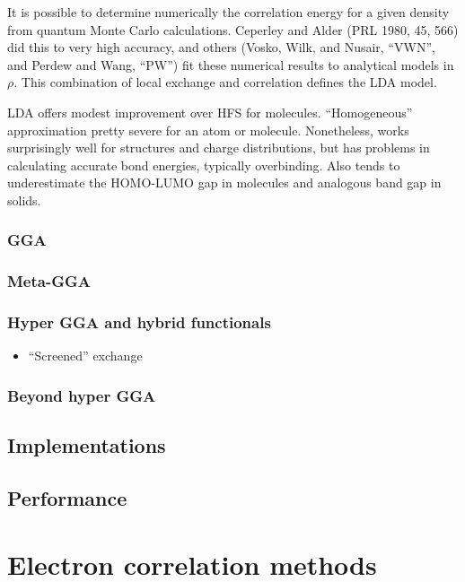 \documentclass[11pt]{article}
\begin{document}
It is possible to determine numerically the correlation energy for a given
density from quantum Monte Carlo calculations. Ceperley and Alder (PRL 1980,
45, 566) did this to very high accuracy, and others (Vosko, Wilk, and Nusair,
``VWN'', and Perdew and Wang, ``PW'') fit these numerical results to analytical
models in \(\rho\). This combination of local exchange and correlation defines the LDA
model.

LDA offers modest improvement over HFS for molecules. ``Homogeneous''
approximation pretty severe for an atom or molecule. Nonetheless, works
surprisingly well for structures and charge distributions, but has problems in
calculating accurate bond energies, typically overbinding. Also tends to
underestimate the HOMO-LUMO gap in molecules and analogous band gap in solids.

\subsubsection{GGA}
\label{sec:org8351d23}

\subsubsection{Meta-GGA}
\label{sec:org8c65834}

\subsubsection{Hyper GGA and hybrid functionals}
\label{sec:org43a66a7}

\begin{itemize}
\item ``Screened'' exchange
\label{sec:orgbdee4ed}
\end{itemize}

\subsubsection{Beyond hyper GGA}
\label{sec:org4f01de6}

\subsection{Implementations}
\label{sec:org46ad3ac}

\subsection{Performance}
\label{sec:orgcf01fab}
\newpage
\newpage
\section{Electron correlation methods}
\label{sec:org11148fb}
\newpage
\end{document}
